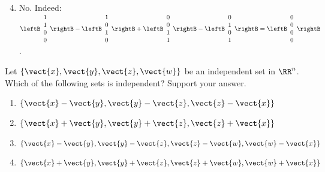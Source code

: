 \begin{multicols}{2}
\begin{ex}
\begin{sol}
\begin{enumerate}[label={\alph*.}]
\setcounter{enumi}{3}
\item  No. Indeed: 
$\leftB \begin{array}{r}
1 \\
1 \\
0 \\
0
\end{array} \rightB
-
\leftB \begin{array}{r}
1 \\
0 \\
1 \\
0
\end{array} \rightB
+
\leftB \begin{array}{r}
0 \\
0 \\
1 \\
1 
\end{array} \rightB
-
\leftB \begin{array}{r}
0 \\
1 \\
0 \\
1 
\end{array} \rightB
=
\leftB \begin{array}{r}
0 \\
0 \\
0 \\
0
\end{array} \rightB$.

\end{enumerate}
\end{sol}
\end{ex}

\begin{ex}
Let $\{\vect{x}, \vect{y}, \vect{z}, \vect{w}\}$ be an independent set in $\RR^n$. Which of the following sets is independent? Support your answer.

\begin{enumerate}[label={\alph*.}]
\item $\{\vect{x} - \vect{y}, \vect{y} - \vect{z}, \vect{z} - \vect{x}\}$

\item $\{\vect{x} + \vect{y}, \vect{y} + \vect{z}, \vect{z} + \vect{x}\}$

\item $\{\vect{x} - \vect{y}, \vect{y} - \vect{z}, \vect{z} - \vect{w}, \vect{w} - \vect{x}\}$

\item $\{\vect{x} + \vect{y}, \vect{y} + \vect{z}, \vect{z} + \vect{w}, \vect{w} + \vect{x}\}$


\end{enumerate}
\end{ex}
\end{multicols}
